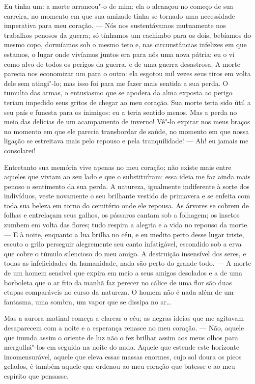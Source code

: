  Eu tinha um: a morte arrancou"-o de mim; ela o alcançou no começo de sua
carreira, no momento em que sua amizade tinha se tornado uma
necessidade imperativa para meu coração. --- Nós nos sustentávamos
mutuamente nos trabalhos penosos da guerra; só tínhamos um cachimbo
para os dois, bebíamos do mesmo copo, dormíamos sob o mesmo teto e, nas
circunstâncias infelizes em que estamos, o lugar onde vivíamos juntos
era para nós uma nova pátria: eu o vi como alvo de todos os perigos da
guerra, e de uma guerra desastrosa. A morte parecia nos economizar um
para o outro: ela esgotou mil vezes seus tiros em volta dele sem
atingi"-lo; mas isso foi para me fazer mais sentida a sua perda. O
tumulto das armas, o entusiasmo que se apodera da alma exposta ao
perigo teriam impedido seus gritos de chegar ao meu coração. Sua morte
teria sido útil a seu país e funesta para os inimigos: eu a teria
sentido menos. Mas a perda no meio das delícias de um acampamento de
inverno! Vê"-lo expirar nos meus braços no momento em que ele parecia
transbordar de saúde, no momento em que nossa ligação se estreitava
mais pelo repouso e pela tranquilidade! --- Ah! eu jamais me
consolarei!

 Entretanto sua memória vive apenas no meu coração; não existe mais
entre aqueles que viviam ao seu lado e que o substituíram: essa ideia
me faz ainda mais penoso o sentimento da sua perda. A natureza,
igualmente indiferente à sorte dos indivíduos, veste novamente o seu
brilhante vestido de primavera e se enfeita com toda sua beleza em
torno do cemitério onde ele repousa. As árvores se cobrem de folhas e
entrelaçam seus galhos, os pássaros cantam sob a folhagem; os insetos
zumbem em volta das flores; tudo respira a alegria e a vida no repouso
da morte. --- E à noite, enquanto a lua brilha no céu, e eu medito
perto desse lugar triste, escuto o grilo perseguir alegremente seu
canto infatigável, escondido sob a erva que cobre o túmulo silencioso
do meu amigo. A destruição insensível dos seres, e todas as
infelicidades da humanidade, nada são perto do grande todo. --- A morte
de um homem sensível que expira em meio a seus amigos desolados e a de
uma borboleta que o ar frio da manhã faz perecer no cálice de uma flor
são duas etapas comparáveis no curso da natureza. O homem não é nada
além de um fantasma, uma sombra, um vapor que se dissipa no ar\ldots

 Mas a aurora matinal começa a clarear o céu; as negras ideias que me
agitavam desaparecem com a noite e a esperança renasce no meu coração.
--- Não, aquele que inunda assim o oriente de luz não o fez brilhar
assim aos meus olhos para mergulhá"-los em seguida na noite do nada.
Aquele que estende este horizonte incomensurável, aquele  que eleva
essas massas enormes, cujo sol doura os picos gelados, é também aquele
que ordenou ao meu coração que batesse e ao meu espírito que pensasse.

